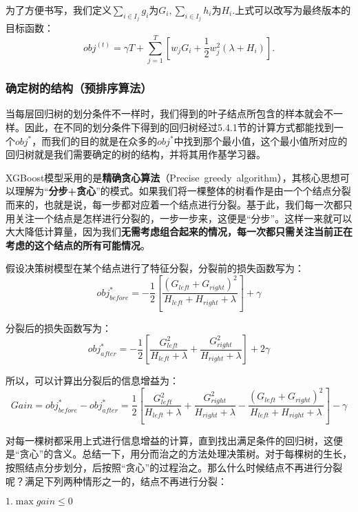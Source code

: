 为了方便书写，我们定义$\sum_{i\in I_{j}}g_{i}\text{为}G_{i} ,\sum_{i\in I_{j}}h_{i} \text{为}H_{i}$.上式可以改写为最终版本的目标函数：
\begin{equation}obj^{(t)}=\gamma T+\sum_{j=1}^T[w_jG_i+\frac12w_j^2(\lambda+H_i)].\end{equation}
\subsubsection{确定树的结构（预排序算法）}
当每层回归树的划分条件不一样时，我们得到的叶子结点所包含的样本就会不一样。因此，在不同的划分条件下得到的回归树经过5.4.1节的计算方式都能找到一个$obj^*$，而我们的目的就是在众多的$obj^*$中找到那个最小值，这个最小值所对应的回归树就是我们需要确定的树的结构，并将其用作基学习器。

XGBoost模型采用的是\textbf{精确贪心算法}（Precise greedy algorithm），其核心思想可以理解为“\textbf{分步+贪心}”的模式。如果我们将一棵整体的树看作是由一个个结点分裂而来的，也就是说，每一步都对应着一个结点进行分裂。基于此，我们每一次都只用关注一个结点是怎样进行分裂的，一步一步来，这便是“分步”。这样一来就可以大大降低计算量，因为我们\textbf{无需考虑组合起来的情况，每一次都只需关注当前正在考虑的这个结点的所有可能情况}。

假设决策树模型在某个结点进行了特征分裂，分裂前的损失函数写为：
\begin{equation}obj_{before}^*=-\frac12[\frac{\left(G_{left}+G_{right}\right)^2}{H_{left}+H_{right}+\lambda}]+\gamma \end{equation}

分裂后的损失函数写为：
\begin{equation}obj_{after}^*=-\frac12[\frac{G_{left}^2}{H_{left}+\lambda}+\frac{G_{right}^2}{H_{right}+\lambda}]+2\gamma \end{equation}

所以，可以计算出分裂后的信息增益为：
\begin{equation}Gain=obj_{before}^*-obj_{after}^*=\frac12[\frac{G_{left}^2}{H_{left}+\lambda}+\frac{G_{right}^2}{H_{right}+\lambda}-\frac{\left(G_{left}+G_{right}\right)^2}{H_{left}+H_{right}+\lambda}]-\gamma \end{equation}

对每一棵树都采用上式进行信息增益的计算，直到找出满足条件的回归树，这便是“贪心”的含义。总结一下，用分而治之的方法处理决策树。对于每棵树的生长，按照结点分步划分，后按照“贪心”的过程治之。那么什么时候结点不再进行分裂呢？满足下列两种情形之一的，结点不再进行分裂：

$1.\max gain\leq0$

